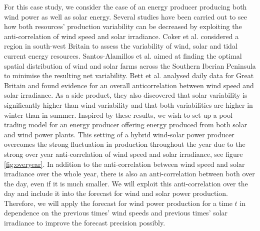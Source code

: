 For this case study, we consider the case of an energy producer producing both wind power as well as solar energy. Several studies have been carried out to see how both resources' production variability  can be decreased by exploiting the anti-correlation of wind speed and solar irradiance. Coker et al. \cite{Coker2013} considered a region in south-west Britain to assess the variability of wind, solar and tidal current energy resources. Santos-Alamillos et al. \cite{Santos-Alamillos} aimed at finding the optimal spatial distribution of wind and solar farms across the Southern Iberian Peninsula to minimise the resulting net variability. Bett et al. \cite{BETT16} analysed daily data for Great Britain and found  evidence for an overall anticorrelation between wind speed and solar irradiance. As a side product, they also discovered that solar variability is significantly higher than wind variability and that both variabilities are higher in winter than in summer. Inspired by these results, we wish to set up a pool trading model for an energy producer offering energy produced from both solar and wind power plants.  
This setting of a hybrid wind-solar power producer
	overcomes the strong fluctuation in production throughout the year due to the strong over year anti-correlation of wind speed and solar irradiance, see figure \ref{fig:overyear}. In addition to
	the anti-correlation between wind speed and solar irradiance over the whole year, there is also an anti-correlation between both over the day, even if it is much smaller. We will exploit this anti-correlation over the day and include it into the forecast
	for wind and solar power production. Therefore, we will apply the forecast for wind power production for a time $t$ in dependence on the previous times' wind speeds and previous times' solar irradiance to improve the forecast precision possibly.
	

